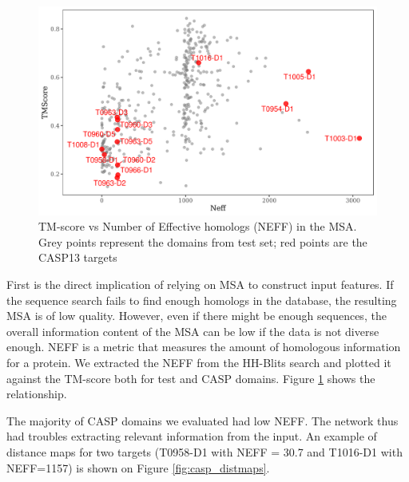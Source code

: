 \begin{figure}
    \centering
    \includegraphics[width=\linewidth]{imgs_tomas/tm_vs_neff.png}
    \caption{TM-score vs Number of Effective homologs (NEFF) in the MSA. Grey points represent the domains from test set; red points are the CASP13 targets}
    \label{fig:tm_vs_neff}
\end{figure}

First is the direct implication of relying on MSA to construct input features. If the sequence search fails to find enough homologs in the database, the resulting MSA is of low quality. However, even if there might be enough sequences, the overall information content of the MSA can be low if the data is not diverse enough. NEFF is a metric that measures the amount of homologous information for a protein\cite{neff}.
We extracted the NEFF from the HH-Blits search and plotted it against the TM-score both for test and CASP domains. Figure \ref{fig:tm_vs_neff} shows the relationship.

The majority of CASP domains we evaluated had low NEFF. The network thus had troubles extracting relevant information from the input. An example of distance maps for two targets (T0958-D1 with NEFF = 30.7 and T1016-D1 with NEFF=1157) is shown on Figure \ref{fig:casp_distmaps}.

